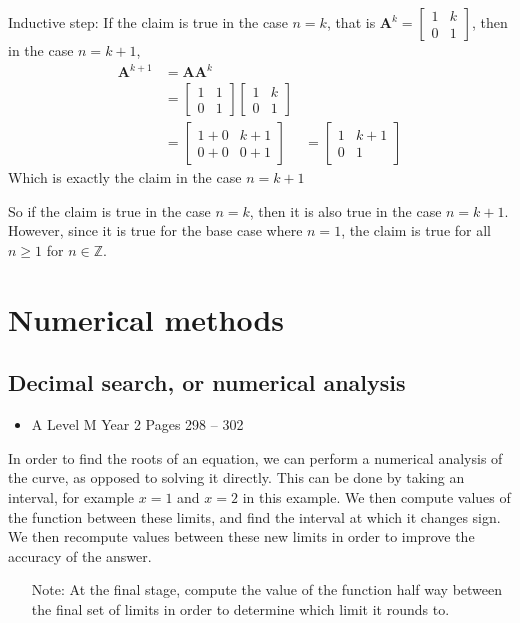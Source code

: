 \documentclass[11pt, a4paper]{article}
\begin{document}
Inductive step: If the claim is true in the case $n=k$, that is $\boldsymbol{A}^{k}=\begin{bmatrix}1&k\\0&1\end{bmatrix}$, then in the case $n=k+1$,
\begin{align*}
\boldsymbol{A}^{k+1}&=\boldsymbol{A}\boldsymbol{A}^{k} \\
&=\begin{bmatrix}1&1\\0&1\end{bmatrix}\begin{bmatrix}1&k\\0&1\end{bmatrix} \\
&=\begin{bmatrix}1+0&k+1\\0+0&0+1\end{bmatrix}
&=\begin{bmatrix}1&k+1\\0&1\end{bmatrix}
\end{align*}
Which is exactly the claim in the case $n=k+1$ \newline \par

So if the claim is true in the case $n=k$, then it is also true in the case $n=k+1$. However, since it is true for the base case where $n=1$, the claim is true for all $n\geq1$ for $n\in\mathbb{Z}$.

\vspace{0.5cm}


\clearpage
\section{Numerical methods}
\vspace{0.5cm}


\subsection{Decimal search, or numerical analysis}
\begin{itemize}
\item A Level M Year 2 \hspace{1cm} \phantom{ AS / } Pages 298 -- 302
\end{itemize} \par
In order to find the roots of an equation,  we can perform a numerical analysis of the curve, as opposed to solving it directly. This can be done by taking an interval, for example $x=1$ and $x=2$ in this example. We then compute values of the function between these limits, and find the interval at which it changes sign. We then recompute values between these new limits in order to improve the accuracy of the answer.
\begin{itemize}
\item[Note:] At the final stage, compute the value of the function half way between the final set of limits in order to determine which limit it rounds to.
\end{itemize}
\vspace{0.5cm}
\end{document}
